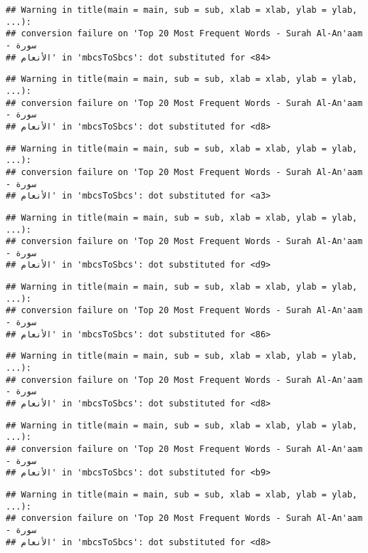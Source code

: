 \documentclass[]{article}
\begin{document}
\begin{verbatim}
## Warning in title(main = main, sub = sub, xlab = xlab, ylab = ylab, ...):
## conversion failure on 'Top 20 Most Frequent Words - Surah Al-An'aam - سورة
## الأنعام' in 'mbcsToSbcs': dot substituted for <84>
\end{verbatim}

\begin{verbatim}
## Warning in title(main = main, sub = sub, xlab = xlab, ylab = ylab, ...):
## conversion failure on 'Top 20 Most Frequent Words - Surah Al-An'aam - سورة
## الأنعام' in 'mbcsToSbcs': dot substituted for <d8>
\end{verbatim}

\begin{verbatim}
## Warning in title(main = main, sub = sub, xlab = xlab, ylab = ylab, ...):
## conversion failure on 'Top 20 Most Frequent Words - Surah Al-An'aam - سورة
## الأنعام' in 'mbcsToSbcs': dot substituted for <a3>
\end{verbatim}

\begin{verbatim}
## Warning in title(main = main, sub = sub, xlab = xlab, ylab = ylab, ...):
## conversion failure on 'Top 20 Most Frequent Words - Surah Al-An'aam - سورة
## الأنعام' in 'mbcsToSbcs': dot substituted for <d9>
\end{verbatim}

\begin{verbatim}
## Warning in title(main = main, sub = sub, xlab = xlab, ylab = ylab, ...):
## conversion failure on 'Top 20 Most Frequent Words - Surah Al-An'aam - سورة
## الأنعام' in 'mbcsToSbcs': dot substituted for <86>
\end{verbatim}

\begin{verbatim}
## Warning in title(main = main, sub = sub, xlab = xlab, ylab = ylab, ...):
## conversion failure on 'Top 20 Most Frequent Words - Surah Al-An'aam - سورة
## الأنعام' in 'mbcsToSbcs': dot substituted for <d8>
\end{verbatim}

\begin{verbatim}
## Warning in title(main = main, sub = sub, xlab = xlab, ylab = ylab, ...):
## conversion failure on 'Top 20 Most Frequent Words - Surah Al-An'aam - سورة
## الأنعام' in 'mbcsToSbcs': dot substituted for <b9>
\end{verbatim}

\begin{verbatim}
## Warning in title(main = main, sub = sub, xlab = xlab, ylab = ylab, ...):
## conversion failure on 'Top 20 Most Frequent Words - Surah Al-An'aam - سورة
## الأنعام' in 'mbcsToSbcs': dot substituted for <d8>
\end{verbatim}
\end{document}
